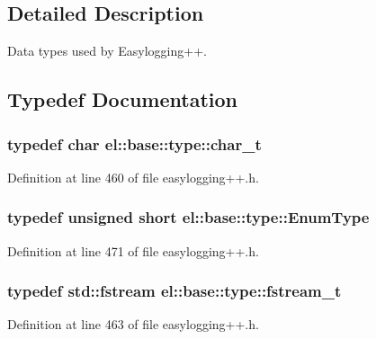 \subsection{Detailed Description}
Data types used by Easylogging++. 

\subsection{Typedef Documentation}
\hypertarget{namespaceel_1_1base_1_1type_ae9fe1ba101c2444b8cad9a2484b54907}{}
\subsubsection[{char\+\_\+t}]{\setlength{\rightskip}{0pt plus 5cm}typedef char {\bf el\+::base\+::type\+::char\+\_\+t}}\label{namespaceel_1_1base_1_1type_ae9fe1ba101c2444b8cad9a2484b54907}


Definition at line 460 of file easylogging++.\+h.

\hypertarget{namespaceel_1_1base_1_1type_afb892a99b7545bf6e45c1e1d84af2ec9}{}
\subsubsection[{Enum\+Type}]{\setlength{\rightskip}{0pt plus 5cm}typedef unsigned short {\bf el\+::base\+::type\+::\+Enum\+Type}}\label{namespaceel_1_1base_1_1type_afb892a99b7545bf6e45c1e1d84af2ec9}


Definition at line 471 of file easylogging++.\+h.

\hypertarget{namespaceel_1_1base_1_1type_a620c830ead75d26b45c060c211ee2685}{}
\subsubsection[{fstream\+\_\+t}]{\setlength{\rightskip}{0pt plus 5cm}typedef std\+::fstream {\bf el\+::base\+::type\+::fstream\+\_\+t}}\label{namespaceel_1_1base_1_1type_a620c830ead75d26b45c060c211ee2685}


Definition at line 463 of file easylogging++.\+h.

